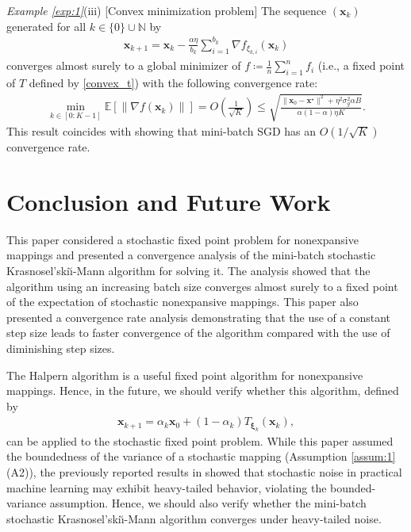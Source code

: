 \documentclass[smallextended,referee,envcountsect,]{svjour3}
\begin{document}
\textit{Example \ref{exp:1}}(iii) [Convex minimization problem] The sequence $(\bm{x}_k)$ generated for all $k \in \{0\} \cup \mathbb{N}$ by 
\begin{align*}
\bm{x}_{k+1} = \bm{x}_k - \frac{\alpha \eta}{b_k} \sum_{i=1}^{b_k} \nabla f_{\xi_{k,i}} (\bm{x}_k) 
\end{align*}
converges almost surely to a global minimizer of $f \coloneqq \frac{1}{n} \sum_{i=1}^n f_i$ (i.e., a fixed point of $T$ defined by \eqref{convex_t}) with the following convergence rate:
\begin{align*}
\min_{k \in [0:K-1]} \mathbb{E} \left[  \left\| \nabla f (\bm{x}_k)  \right\| \right] 
= O \left( \frac{1}{\sqrt{K}} \right)
\leq
\sqrt{ 
\frac{\| \bm{x}_{0} - \bm{x}^\star \|^2 
+ 
\eta^2 \sigma_g^2 \alpha B}{\alpha (1 - \alpha) \eta K}}.
\end{align*}
This result coincides with \cite[Theorem 3.2]{umeda2025increasing} showing that mini-batch SGD has an $O(1/\sqrt{K})$ convergence rate. 

\section{Conclusion and Future Work}
This paper considered a stochastic fixed point problem for nonexpansive mappings and presented a convergence analysis of the mini-batch stochastic Krasnosel'ski\u\i-Mann algorithm for solving it. The analysis showed that the algorithm using an increasing batch size converges almost surely to a fixed point of the expectation of stochastic nonexpansive mappings. This paper also presented a convergence rate analysis demonstrating that the use of a constant step size leads to faster convergence of the algorithm compared with the use of diminishing step sizes.

The Halpern algorithm is a useful fixed point algorithm for nonexpansive mappings. Hence, in the future, we should verify whether this algorithm, defined by 
\begin{align*}
\bm{x}_{k+1} = \alpha_k \bm{x}_0 + (1 - \alpha_k) T_{\bm{\xi}_k} (\bm{x}_k),
\end{align*}
can be applied to the stochastic fixed point problem. While this paper assumed the boundedness of the variance of a stochastic mapping (Assumption \ref{assum:1}(A2)), the previously reported results in \cite{pmlr-v97-simsekli19a,pmlr-v139-garg21b,pmlr-v238-battash24a,ahn2024linear} showed that stochastic noise in practical machine learning may exhibit heavy-tailed behavior, violating the bounded-variance assumption. Hence, we should also verify whether the mini-batch stochastic Krasnosel'ski\u\i-Mann algorithm converges under heavy-tailed noise.
\end{document}
